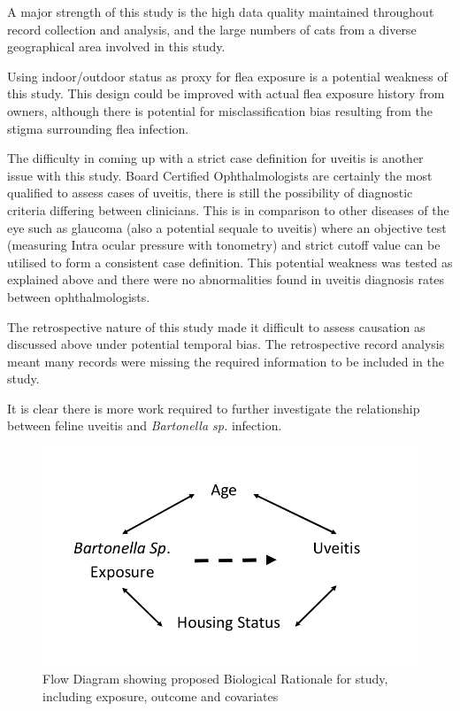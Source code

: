 \documentclass[11pt,twocolumn]{article}
\begin{document}
		A major strength of this study is the high data quality maintained throughout record collection and analysis, and the large numbers of cats from a diverse geographical area involved in this study.


		Using indoor/outdoor status as proxy for flea exposure is a potential weakness of this study. 
		This design could be improved with actual flea exposure history from owners, although there is potential for misclassification bias resulting from the stigma surrounding flea infection.
		
		
		The difficulty in coming up with a strict case definition for uveitis is another issue with this study. 
		Board Certified Ophthalmologists are certainly the most qualified to assess cases of uveitis, there is still the possibility of diagnostic criteria differing between clinicians. 
		This is in comparison to other diseases of the eye such as glaucoma (also a potential sequale to uveitis) where an objective test (measuring Intra ocular pressure with tonometry) and strict cutoff value can be utilised to form a consistent case definition.
		This potential weakness was tested as explained above and there were no abnormalities found in uveitis diagnosis rates between ophthalmologists.


		The retrospective nature of this study made it difficult to assess causation as discussed above under potential temporal bias. The retrospective record analysis meant many records were missing the required information to be included in the study.

		
		It is clear there is more work required to further investigate the relationship between feline uveitis and \emph{Bartonella sp.} infection.
\newpage
\begin{figure}[h!]
	\centering
	\includegraphics[scale=0.3]{figure1.jpg}
	\caption{Flow Diagram showing proposed Biological Rationale for study, including exposure, outcome and covariates }
	\label{fig:1}
\end{figure}
\end{document}

